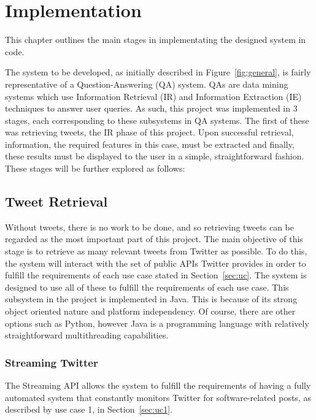\chapter{Implementation}
\label{cha:impl}
This chapter outlines the main stages in implementating the designed system in code.


The system to be developed, as initially described in Figure~\ref{fig:general}, is fairly representative of a Question-Answering (QA) system. QAs are data mining systems which use Information Retrieval (IR) and Information Extraction (IE) techniques to answer user queries. As such, this project was implemented in 3 stages, each corresponding to these subsystems in QA systems. The first of these was retrieving tweets, the IR phase of this project. Upon successful retrieval, information, the required features in this case, must be extracted and finally, these results must be displayed to the user in a simple, straightforward fashion. These stages will be further explored as follows:

\java
\section{Tweet Retrieval}
Without tweets, there is no work to be done, and so retrieving tweets can be regarded as the most important part of this project. The main objective of this stage is to retrieve as many relevant tweets from Twitter as possible. To do this, the system will interact with the set of public APIs Twitter provides in order to fulfill the requirements of each use case stated in Section~\ref{sec:uc}. The system is designed to use all of these to fulfill the requirements of each use case. This subsystem in the project is implemented in Java. This is because of its strong object oriented nature and platform independency. Of course, there are other options such as Python, however Java is a programming language with relatively straightforward multithreading capabilities.

\subsection{Streaming Twitter}
The Streaming API allows the system to fulfill the requirements of having a fully automated system that constantly monitors Twitter for software-related posts, as described by use case 1, in Section~\ref{sec:uc1}. 

